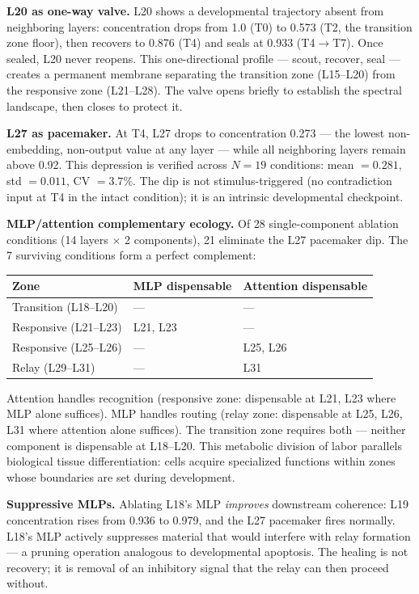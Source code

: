 \documentclass[12pt]{article}
\begin{document}
\textbf{L20 as one-way valve.} L20 shows a developmental trajectory absent from neighboring layers: concentration drops from 1.0 (T0) to 0.573 (T2, the transition zone floor), then recovers to 0.876 (T4) and seals at 0.933 (T4$\to$T7). Once sealed, L20 never reopens. This one-directional profile --- scout, recover, seal --- creates a permanent membrane separating the transition zone (L15--L20) from the responsive zone (L21--L28). The valve opens briefly to establish the spectral landscape, then closes to protect it.

\textbf{L27 as pacemaker.} At T4, L27 drops to concentration 0.273 --- the lowest non-embedding, non-output value at any layer --- while all neighboring layers remain above 0.92. This depression is verified across $N=19$ conditions: mean $= 0.281$, std $= 0.011$, CV $= 3.7\%$. The dip is not stimulus-triggered (no contradiction input at T4 in the intact condition); it is an intrinsic developmental checkpoint.

\textbf{MLP/attention complementary ecology.} Of 28 single-component ablation conditions (14 layers $\times$ 2 components), 21 eliminate the L27 pacemaker dip. The 7 surviving conditions form a perfect complement:

\begin{table}[h]
\centering
\begin{tabular}{lll}
\toprule
\textbf{Zone} & \textbf{MLP dispensable} & \textbf{Attention dispensable} \\
\midrule
Transition (L18--L20) & --- & --- \\
Responsive (L21--L23) & L21, L23 & --- \\
Responsive (L25--L26) & --- & L25, L26 \\
Relay (L29--L31) & --- & L31 \\
\bottomrule
\end{tabular}
\end{table}

Attention handles recognition (responsive zone: dispensable at L21, L23 where MLP alone suffices). MLP handles routing (relay zone: dispensable at L25, L26, L31 where attention alone suffices). The transition zone requires both --- neither component is dispensable at L18--L20. This metabolic division of labor parallels biological tissue differentiation: cells acquire specialized functions within zones whose boundaries are set during development.

\textbf{Suppressive MLPs.} Ablating L18's MLP \textit{improves} downstream coherence: L19 concentration rises from 0.936 to 0.979, and the L27 pacemaker fires normally. L18's MLP actively suppresses material that would interfere with relay formation --- a pruning operation analogous to developmental apoptosis. The healing is not recovery; it is removal of an inhibitory signal that the relay can then proceed without.
\end{document}
